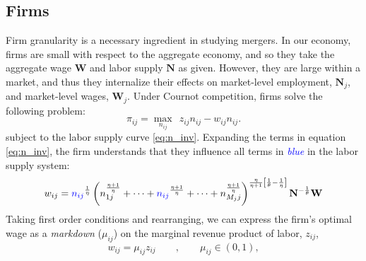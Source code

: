 \documentclass[12pt]{article}
\theoremstyle{prop}
\begin{document}
\subsection{Firms}\label{sec:firms}
Firm granularity is a necessary ingredient in studying mergers.
In our economy, firms are small with respect to the aggregate economy, and so they take the aggregate wage $\mathbf{W}$ and labor supply $\mathbf{N}$ as given.
However, they are large within a market, and thus they internalize their effects on market-level employment, $\mathbf{N}_j$, and market-level wages, $\mathbf{W}_j$.
Under Cournot competition, firms solve the following problem:
 \begin{equation*}
	\pi_{ij} = \max_{n_{ij}}\:\: z_{ij}  n_{ij}-w_{ij}n_{ij} .
	\end{equation*}
subject to the labor supply curve \eqref{eq:n_inv}.
Expanding the terms in equation \eqref{eq:n_inv}, the firm understands that they influence all terms in \textcolor{blue}{\emph{blue}} in the labor supply system:
\begin{align*}
 	w_{ij} =  \textcolor{blue}{n_{ij}} ^\frac{1}{\eta}\left(  n_{1j}^{\frac{\eta+1}{\eta}}+\dots+\textcolor{blue}{n_{ij}}^{\frac{\eta+1}{\eta}}+\dots + n_{M_{j}j}^{\frac{\eta+1}{\eta}}\right)^{\frac{\eta}{\eta+1}\left[{\frac{1}{\theta}-\frac{1}{\eta}}\right]} \mathbf{N}^{-\frac{1}{\theta}} \textbf{W}
 \end{align*}
Taking first order conditions and rearranging, we can express the firm's optimal wage as a \emph{markdown} ($\mu_{ij}$) on the marginal revenue product of labor, $z_{ij}$,
\vspace*{-.3cm}\begin{equation}\label{eq:wageMRPL}
	w_{ij} = \mu_{ij} z_{ij}\quad\quad,\quad\quad \mu_{ij}\in(0,1),
\end{equation}
\end{document}
